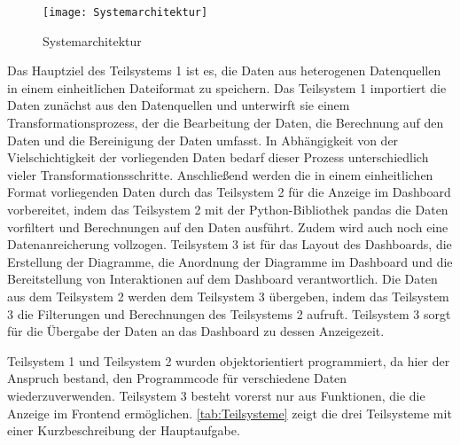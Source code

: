     \begin{figure}[H]
        \centering
            \texttt{[image: Systemarchitektur]}
            \caption{Systemarchitektur}
            \label{fig:Systemarchitektur}
    \end{figure}

    Das Hauptziel des Teilsystems 1 ist es, die Daten aus heterogenen Datenquellen in einem einheitlichen Dateiformat zu speichern.
    Das Teilsystem 1 importiert die Daten zunächst aus den Datenquellen und unterwirft sie einem Transformationsprozess, der die Bearbeitung der Daten, die Berechnung
    auf den Daten und die Bereinigung der Daten umfasst. In Abhängigkeit von der Vielschichtigkeit der vorliegenden Daten bedarf dieser Prozess unterschiedlich vieler Transformationsschritte.  
    Anschließend werden die in einem einheitlichen Format vorliegenden Daten durch das Teilsystem 2 
    für die Anzeige im Dashboard vorbereitet, indem das Teilsystem 2 mit der Python-Bibliothek pandas die Daten vorfiltert und Berechnungen auf den Daten ausführt. 
    Zudem wird auch noch eine Datenanreicherung vollzogen. Teilsystem 3 ist für das Layout des Dashboards, die Erstellung der Diagramme, die Anordnung der Diagramme im Dashboard und 
    die Bereitstellung von Interaktionen auf dem Dashboard verantwortlich. Die Daten aus dem Teilsystem 2 werden dem Teilsystem 3 übergeben,
    indem das Teilsystem 3 die Filterungen und Berechnungen des Teilsystems 2 aufruft. Teilsystem 3 sorgt für die Übergabe der Daten an das Dashboard zu dessen Anzeigezeit.
    
    Teilsystem 1 und Teilsystem 2 wurden objektorientiert programmiert, da hier der Anspruch bestand, den Programmcode
    für verschiedene Daten wiederzuverwenden. Teilsystem 3 besteht vorerst nur aus Funktionen, die die Anzeige im Frontend ermöglichen.
    \autoref{tab:Teilsysteme} zeigt die drei Teilsysteme mit einer Kurzbeschreibung der Hauptaufgabe.

